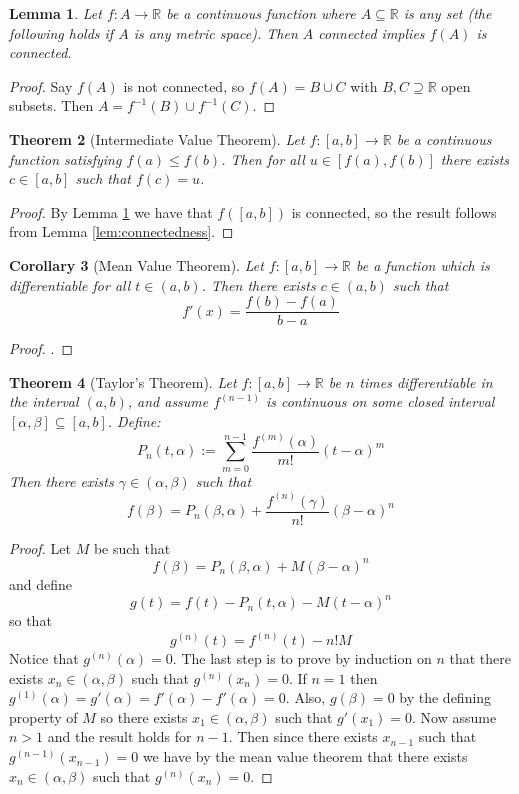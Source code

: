 \documentclass[12pt]{article}
\theoremstyle{plain}
\newtheorem{thm}{Theorem}[subsection] %
\newtheorem{lemma}[thm]{Lemma}
\newtheorem{cor}[thm]{Corollary}
\theoremstyle{definition}
\newcommand{\bb}[1]{\mathbb{#1}}
\newcommand{\lto}{\longrightarrow}
\begin{document}
\begin{lemma}
\label{lem:connected_continuous}
Let $f: A \lto \bb{R}$ be a continuous function where $A \subseteq \bb{R}$ is any set (the following holds if $A$ is any metric space). Then $A$ connected implies $f(A)$ is connected.
\end{lemma}
\begin{proof}
Say $f(A)$ is not connected, so $f(A) = B \cup C$ with $B,C \supseteq \bb{R}$ open subsets. Then $A = f^{-1}(B) \cup f^{-1}(C)$.
\end{proof}
\begin{thm}[Intermediate Value Theorem]
Let $f: [a,b] \lto \bb{R}$ be a continuous function satisfying $f(a) \leq f(b)$. Then for all $u \in [f(a),f(b)]$ there exists $c \in [a,b]$ such that $f(c) = u$.
\end{thm}
\begin{proof}
By Lemma \ref{lem:connected_continuous} we have that $f([a,b])$ is connected, so the result follows from Lemma \ref{lem:connectedness}.
\end{proof}
\begin{cor}[Mean Value Theorem]
Let $f: [a,b] \lto \bb{R}$ be a function which is differentiable for all $t \in (a,b)$. Then there exists $c \in (a,b)$ such that
\[f'(x) = \frac{f(b) - f(a)}{b-a}\]
\end{cor}
\begin{proof}
\cite{rudin}.
\end{proof}
\begin{thm}[Taylor's Theorem]
Let $f: [a,b] \lto \bb{R}$ be $n$ times differentiable in the interval $(a,b)$, and assume $f^{(n-1)}$ is continuous on some closed interval $[\alpha,\beta] \subseteq [a,b]$. Define:
\[P_n(t,\alpha) := \sum_{m = 0}^{n-1} \frac{f^{(m)}(\alpha)}{m!}(t - \alpha)^m\]
Then there exists $\gamma \in (\alpha,\beta)$ such that
\[f(\beta) = P_{n}(\beta,\alpha) + \frac{f^{(n)}(\gamma)}{n!}(\beta - \alpha)^n\]
\end{thm}
\begin{proof}
Let $M$ be such that
\[f(\beta) = P_n(\beta,\alpha) + M(\beta - \alpha)^n\]
and define
\[g(t) = f(t) - P_n(t,\alpha) - M(t - \alpha)^n\]
so that
\[g^{(n)}(t) = f^{(n)}(t) - n!M\]
Notice that $g^{(n)}(\alpha) = 0$. The last step is to prove by induction on $n$ that there exists $x_n \in (\alpha, \beta)$ such that $g^{(n)}(x_n) = 0$. If $n = 1$ then $g^{(1)}(\alpha) = g'(\alpha) = f'(\alpha) - f'(\alpha) = 0$. Also, $g(\beta) = 0$ by the defining property of $M$ so there exists $x_1 \in (\alpha,\beta)$ such that $g'(x_1) = 0$. Now assume $n > 1$ and the result holds for $n - 1$. Then since there exists $x_{n-1}$ such that $g^{(n-1)}(x_{n-1}) = 0$ we have by the mean value theorem that there exists $x_n \in (\alpha,\beta)$ such that $g^{(n)}(x_n) = 0$.
\end{proof}
\end{document}
